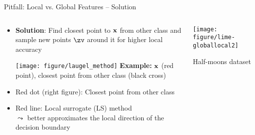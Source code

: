 \documentclass[10pt,compress,t,notes=noshow, xcolor=table]{beamer}
\begin{document}
\begin{frame}{Pitfall: Local vs. Global Features -- Solution }
\begin{columns}[T, totalwidth=\textwidth]
	\begin{column}{0.6\textwidth}
		\begin{itemize}
		\item \textbf{Solution}: 
		Find closest point to $\mathbf{x}$ from other class and sample new points $\zv$ around it for higher local accuracy
		\begin{center}
		\texttt{[image: figure/laugel\_method]}
		\scriptsize{\textbf{Example:} $\mathbf{x}$ (red point), closest point from other class (black cross)}
		\end{center}
		\pause
		\item Red dot (right figure): Closest point from other class

		\item Red line: Local surrogate (LS) method \\
		$\leadsto$ better approximates the local direction of the decision boundary 
	\end{itemize}
\end{column}
\begin{column}{0.39\textwidth}

	\begin{center}
	\texttt{[image: figure/lime-globallocal2]}
	
	{Half-moons dataset}
	
\end{center}

	\end{column}

\end{columns}
\end{frame}
\end{document}
